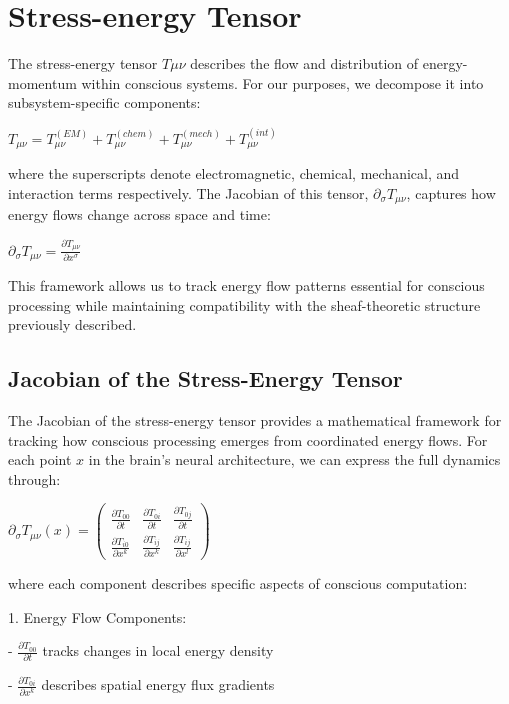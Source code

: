 \section{Stress-energy Tensor}

The stress-energy tensor $T\mu\nu$ describes the flow and distribution of energy-momentum within conscious systems. For our purposes, we decompose it into subsystem-specific components:

$T_{\mu\nu} = T_{\mu\nu}^{(EM)} + T_{\mu\nu}^{(chem)} + T_{\mu\nu}^{(mech)} + T_{\mu\nu}^{(int)}$

where the superscripts denote electromagnetic, chemical, mechanical, and interaction terms respectively. The Jacobian of this tensor, $\partial_\sigma T_{\mu\nu}$, captures how energy flows change across space and time:

$\partial_\sigma T_{\mu\nu} = \frac{\partial T_{\mu\nu}}{\partial x^\sigma}$

This framework allows us to track energy flow patterns essential for conscious processing while maintaining compatibility with the sheaf-theoretic structure previously described.

\subsection{Jacobian of the Stress-Energy Tensor}

The Jacobian of the stress-energy tensor provides a mathematical framework for tracking how conscious processing emerges from coordinated energy flows. For each point $x$ in the brain's neural architecture, we can express the full dynamics through:

$\partial_\sigma T_{\mu\nu}(x) = \begin{pmatrix} 
\frac{\partial T_{00}}{\partial t} & \frac{\partial T_{0i}}{\partial t} & \frac{\partial T_{0j}}{\partial t} \\[1em]
\frac{\partial T_{i0}}{\partial x^k} & \frac{\partial T_{ij}}{\partial x^k} & \frac{\partial T_{ij}}{\partial x^l}
\end{pmatrix}$

where each component describes specific aspects of conscious computation:

1. Energy Flow Components:

- $\frac{\partial T_{00}}{\partial t}$ tracks changes in local energy density

- $\frac{\partial T_{0i}}{\partial x^k}$ describes spatial energy flux gradients

